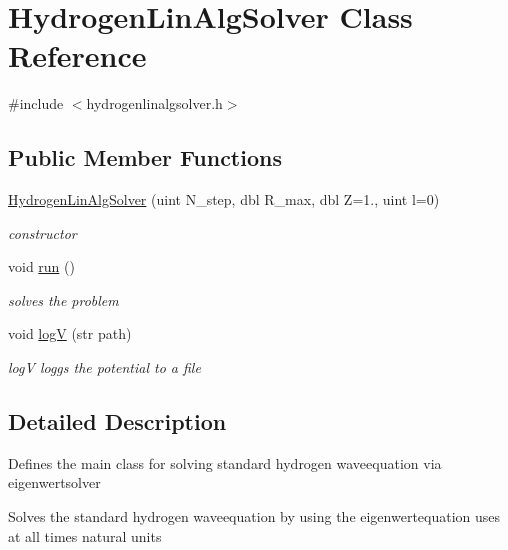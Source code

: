 \hypertarget{class_hydrogen_lin_alg_solver}{\section{Hydrogen\-Lin\-Alg\-Solver Class Reference}
\label{class_hydrogen_lin_alg_solver}
}


{\ttfamily \#include $<$hydrogenlinalgsolver.\-h$>$}

\subsection*{Public Member Functions}
\begin{DoxyCompactItemize}
\item 
\hyperlink{class_hydrogen_lin_alg_solver_a2532bd8f2a6c38f8019be1499d7d8ad5}{Hydrogen\-Lin\-Alg\-Solver} (uint N\-\_\-step, dbl R\-\_\-max, dbl Z=1., uint l=0)
\begin{DoxyCompactList}\small\item\em constructor \end{DoxyCompactList}\item 
\hypertarget{class_hydrogen_lin_alg_solver_a11597d0b5728926bdb28ade85621bb94}{void \hyperlink{class_hydrogen_lin_alg_solver_a11597d0b5728926bdb28ade85621bb94}{run} ()}\label{class_hydrogen_lin_alg_solver_a11597d0b5728926bdb28ade85621bb94}

\begin{DoxyCompactList}\small\item\em solves the problem \end{DoxyCompactList}\item 
void \hyperlink{class_hydrogen_lin_alg_solver_a6bc283dc14305bc00b4d38860a891448}{log\-V} (str path)
\begin{DoxyCompactList}\small\item\em log\-V loggs the potential to a file \end{DoxyCompactList}\end{DoxyCompactItemize}


\subsection{Detailed Description}
Defines the main class for solving standard hydrogen waveequation via eigenwertsolver

Solves the standard hydrogen waveequation by using the eigenwertequation uses at all times natural units

